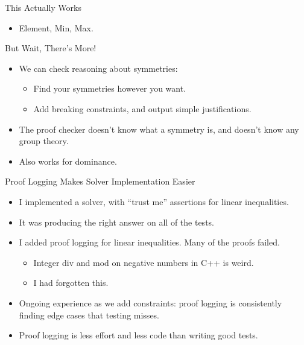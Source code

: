 \documentclass[aspectratio=169,compress,10pt]{beamer}
\begin{document}
\begin{frame}[t]{This Actually Works}
{\begin{itemize}
            \item Element, Min, Max.
        \end{itemize}
    }
\end{frame}

\begin{frame}{But Wait, There's More!}
    \begin{itemize}
        \item We can check reasoning about symmetries:
            \begin{itemize}
                \item Find your symmetries however you want.
                \item Add breaking constraints, and output simple justifications.
            \end{itemize}
        \item The proof checker doesn't know what a symmetry is, and doesn't know
            any group theory.
        \item Also works for dominance.
    \end{itemize}
\end{frame}

\begin{frame}{Proof Logging Makes Solver Implementation Easier}
    \begin{itemize}
        \item I implemented a solver, with ``trust me'' assertions for linear inequalities.
        \item It was producing the right answer on all of the tests.
        \item I added proof logging for linear inequalities. Many of the proofs failed.
            \begin{itemize}
                \item Integer div and mod on negative numbers in C++ is weird.
                \item I had forgotten this.
            \end{itemize}
        \item Ongoing experience as we add constraints: proof logging is consistently finding edge cases
            that testing misses.
        \item Proof logging is less effort and less code than writing good tests.
    \end{itemize}
\end{frame}
\end{document}
